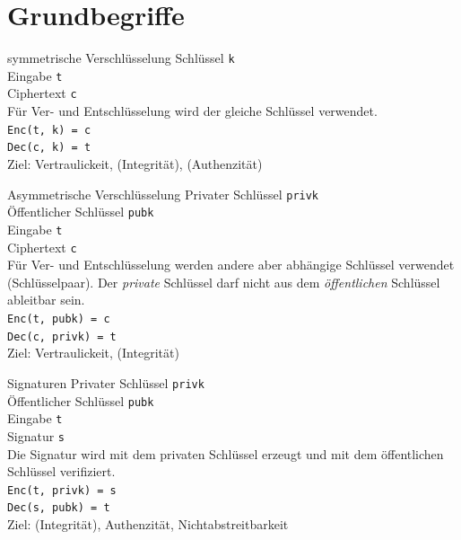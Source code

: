 \documentclass[10pt]{beamer}
\begin{document}
	\section{Grundbegriffe}
	
	\begin{frame}{symmetrische Verschlüsselung}
		\alert{Schlüssel} \texttt{k}\\
		\alert{Eingabe} \texttt{t}\\
		\alert{Ciphertext} \texttt{c}\\
		\vspace{0.5cm}
		Für Ver- und Entschlüsselung wird der gleiche Schlüssel verwendet.\\
		\texttt{Enc(t, k) = c}\\
		\texttt{Dec(c, k) = t}\\
		Ziel: Vertraulickeit, (Integrität), (Authenzität)
	\end{frame}
	
	\begin{frame}{Asymmetrische Verschlüsselung}
		\alert{Privater Schlüssel} \texttt{privk}\\
		\alert{Öffentlicher Schlüssel} \texttt{pubk}\\
		\alert{Eingabe} \texttt{t}\\
		\alert{Ciphertext} \texttt{c}\\
		\vspace{0.5cm}
		Für Ver- und Entschlüsselung werden andere aber abhängige Schlüssel verwendet (Schlüsselpaar).
		Der \emph{private} Schlüssel darf nicht aus dem \emph{öffentlichen} Schlüssel ableitbar sein.\\
		\texttt{Enc(t, pubk) = c}\\
		\texttt{Dec(c, privk) = t}\\
		\alert{Ziel}: Vertraulickeit, (Integrität)\\
	\end{frame}

	\begin{frame}{Signaturen}
		\alert{Privater Schlüssel} \texttt{privk}\\
		\alert{Öffentlicher Schlüssel} \texttt{pubk}\\
		\alert{Eingabe} \texttt{t}\\
		\alert{Signatur} \texttt{s}\\
		\vspace{0.5cm}
		Die Signatur wird mit dem privaten Schlüssel erzeugt und mit dem öffentlichen Schlüssel verifiziert.\\
		\texttt{Enc(t, privk) = s}\\
		\texttt{Dec(s, pubk) = t}\\
		\alert{Ziel}: (Integrität), Authenzität, Nichtabstreitbarkeit\\
	\end{frame}
\end{document}
